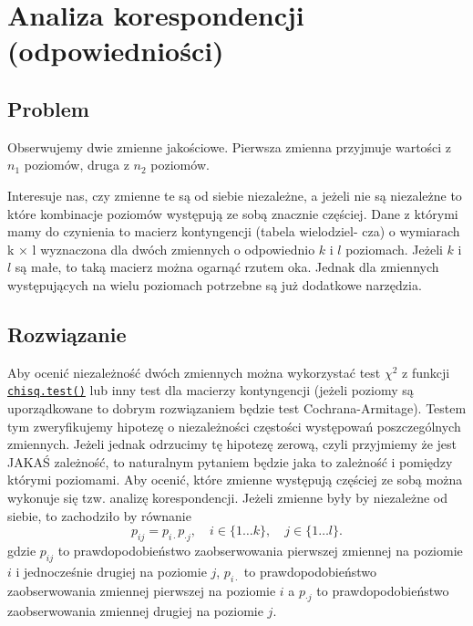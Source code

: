 \documentclass[polish,]{book}
\begin{document}
\hypertarget{part_6}{%
\chapter{Analiza korespondencji (odpowiedniości)}\label{part_6}}

\hypertarget{part_61}{%
\section{Problem}\label{part_61}}

Obserwujemy dwie zmienne jakościowe. Pierwsza zmienna przyjmuje wartości z \(n_1\)
poziomów, druga z \(n_2\) poziomów.

Interesuje nas, czy zmienne te są od siebie niezależne, a jeżeli nie są niezależne
to które kombinacje poziomów występują ze sobą znacznie częściej.
Dane z którymi mamy do czynienia to macierz kontyngencji (tabela wielodziel-
cza) o wymiarach k × l wyznaczona dla dwóch zmiennych o odpowiednio \(k\) i \(l\) poziomach. Jeżeli \(k\) i \(l\) są małe, to taką macierz można ogarnąć rzutem oka. Jednak dla zmiennych występujących na wielu poziomach potrzebne są już dodatkowe narzędzia.

\hypertarget{part_62}{%
\section{Rozwiązanie}\label{part_62}}

Aby ocenić niezależność dwóch zmiennych można wykorzystać test \(\chi^2\) z funkcji
\href{https://rdrr.io/r/stats/chisq.test.html}{\texttt{chisq.test()}} lub inny test dla macierzy kontyngencji (jeżeli poziomy są uporządkowane to dobrym rozwiązaniem będzie test Cochrana-Armitage). Testem tym zweryfikujemy hipotezę o niezależności częstości występowań poszczególnych zmiennych.
Jeżeli jednak odrzucimy tę hipotezę zerową, czyli przyjmiemy że jest JAKAŚ
zależność, to naturalnym pytaniem będzie jaka to zależność i pomiędzy którymi
poziomami.
Aby ocenić, które zmienne występują częściej ze sobą można wykonuje się tzw.
analizę korespondencji. Jeżeli zmienne były by niezależne od siebie, to zachodziło
by równanie
\[
p_{ij}=p_{i\cdot}p_{\cdot j},\quad i\in \{1\dots k\},\quad j\in \{1\dots l\}.
\]
gdzie \(p_{ij}\) to prawdopodobieństwo zaobserwowania pierwszej zmiennej na poziomie
\(i\) i jednocześnie drugiej na poziomie \(j\), \(p_{i\cdot}\) to prawdopodobieństwo zaobserwowania zmiennej pierwszej na poziomie \(i\) a \(p_{\cdot j}\) to prawdopodobieństwo zaobserwowania zmiennej drugiej na poziomie \(j\).
\end{document}

